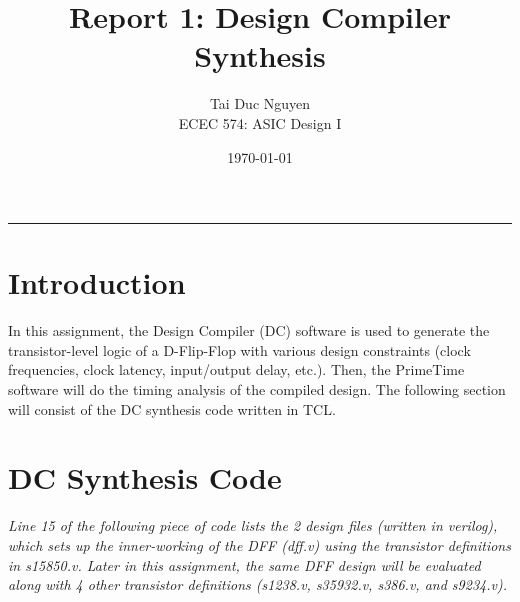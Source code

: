 \documentclass[letterpaper, 11pt]{article}
\title{Report 1: Design Compiler Synthesis}
\author{
Tai Duc Nguyen \\
ECEC 574: ASIC Design I
}
\date{\today}
\begin{document}
\maketitle

\rule{\textwidth}{1pt}

\section{Introduction}

In this assignment, the Design Compiler (DC) software is used to generate the transistor-level logic of a D-Flip-Flop with various design constraints (clock frequencies, clock latency, input/output delay, etc.). Then, the PrimeTime software will do the timing analysis of the compiled design. The following section will consist of the DC synthesis code written in TCL.

\section{DC Synthesis Code}

\textit{Line 15 of the following piece of code lists the 2 design files (written in verilog), which sets up the inner-working of the DFF (dff.v) using the transistor definitions in s15850.v. Later in this assignment, the same DFF design will be evaluated along with 4 other transistor definitions (s1238.v, s35932.v, s386.v, and s9234.v).}
\end{document}
